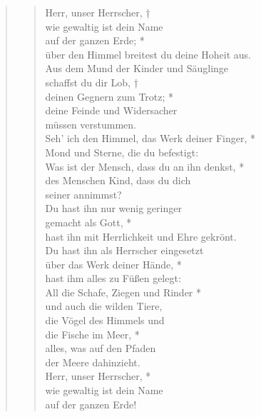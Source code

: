 \begin{quote}
\begin{verse}
Herr, unser Herrscher, †\\
wie gewaltig ist dein Name \\
auf der ganzen Erde; *\\
über den Himmel breitest du deine Hoheit aus. \\
\vin Aus dem Mund der Kinder und Säuglinge\\ 
\vin schaffst du dir Lob, †\\
\vin deinen Gegnern zum Trotz; *\\
\vin deine Feinde und Widersacher\\ 
\vin müssen verstummen.\\
Seh' ich den Himmel, das Werk deiner Finger, *\\
Mond und Sterne, die du befestigt:\\
\vin Was ist der Mensch, dass du an ihn denkst, *\\
\vin des Menschen Kind, dass du dich \\ 
\vin seiner annimmst?\\
Du hast ihn nur wenig geringer\\
gemacht als Gott, *\\
hast ihn mit Herrlichkeit und Ehre gekrönt.\\
\vin Du hast ihn als Herrscher eingesetzt \\
\vin über das Werk deiner Hände, *\\
\vin hast ihm alles zu Füßen gelegt:\\
All die Schafe, Ziegen und Rinder *\\
und auch die wilden Tiere,\\
\vin die Vögel des Himmels und\\
\vin die Fische im Meer, *\\
\vin alles, was auf den Pfaden\\ 
\vin der Meere dahinzieht.\\
Herr, unser Herrscher, *\\
wie gewaltig ist dein Name\\
auf der ganzen Erde!\\


\end{verse}

\begin{verse}


\smallskip


\end{verse}
\end{quote}
